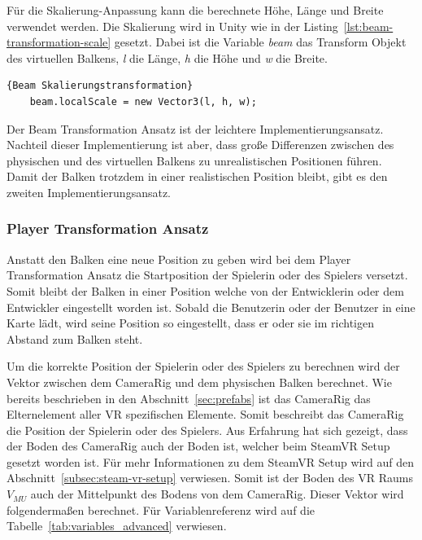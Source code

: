 Für die Skalierung-Anpassung kann die berechnete Höhe, Länge und Breite verwendet werden.
Die Skalierung wird in Unity wie in der Listing~\ref{lst:beam-transformation-scale} gesetzt.
Dabei ist die Variable \emph{beam} das Transform Objekt des virtuellen Balkens, \emph{l}  die Länge, \emph{h} die Höhe und \emph{w} die Breite.

\begin{lstlisting}[language={[Sharp]C},label={lst:beam-transformation-scale}, caption={Beam Skalierungstransformation}]{Beam Skalierungstransformation}
    beam.localScale = new Vector3(l, h, w);
\end{lstlisting}

Der Beam Transformation Ansatz ist der leichtere Implementierungsansatz.
Nachteil dieser Implementierung ist aber, dass große Differenzen zwischen des physischen und des virtuellen Balkens zu unrealistischen Positionen führen.
Damit der Balken trotzdem in einer realistischen Position bleibt, gibt es den zweiten Implementierungsansatz.

\subsubsection{Player Transformation Ansatz}

Anstatt den Balken eine neue Position zu geben wird bei dem Player Transformation Ansatz die Startposition der Spielerin oder des Spielers versetzt.
Somit bleibt der Balken in einer Position welche von der Entwicklerin oder dem Entwickler eingestellt worden ist.
Sobald die Benutzerin oder der Benutzer in eine Karte lädt, wird seine Position so eingestellt, dass er oder sie im richtigen Abstand zum Balken steht.

Um die korrekte Position der Spielerin oder des Spielers zu berechnen wird der Vektor zwischen dem CameraRig und dem physischen Balken berechnet.
Wie bereits beschrieben in den Abschnitt~\ref{sec:prefabs} ist das CameraRig das Elternelement aller VR spezifischen Elemente.
Somit beschreibt das CameraRig die Position der Spielerin oder des Spielers.
Aus Erfahrung hat sich gezeigt, dass der Boden des CameraRig auch der Boden ist, welcher beim SteamVR Setup gesetzt worden ist.
Für mehr Informationen zu dem SteamVR Setup wird auf den Abschnitt~\ref{subsec:steam-vr-setup} verwiesen.
Somit ist der Boden des VR Raums $V_{MU}$ auch der Mittelpunkt des Bodens von dem CameraRig.
Dieser Vektor wird folgendermaßen berechnet.
Für Variablenreferenz wird auf die Tabelle~\ref{tab:variables_advanced} verwiesen.

